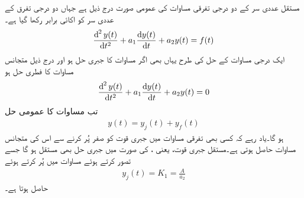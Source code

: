 مستقل عددی سر کے دو درجی تفرقی مساوات کی عمومی صورت درج ذیل ہے جہاں دو درجی تفرق کے عددی سر کو اکائی برابر رکھا گیا ہے۔
\begin{align}\label{مساوات_عارضی_دو_درجی_عمومی_الف}
\frac{\dif^{\,2} y(t)}{\dif t^2}+a_1\frac{\dif y(t)}{\dif t}+a_2 y(t)=f(t)
\end{align}
ایک درجی مساوات کے حل کی طرح یہاں بھی اگر مساوات  کا جبری حل  ہو اور درج ذیل متجانس مساوات کا فطری حل  ہو
 \begin{align}\label{مساوات_عارضی_دو_درجی_عمومی_ہم_جنسی_الف}
\frac{\dif^{\,2} y(t)}{\dif t^2}+a_1\frac{\dif y(t)}{\dif t}+a_2 y(t)=0
\end{align}
تب مساوات  کا عمومی حل
\begin{align}
y(t)=y_j(t)+y_f(t)
\end{align}
ہو گا۔یاد رہے کہ کسی بھی تفرقی مساوات میں جبری قوت کو صفر  پُر کرنے سے اس کی متجانس مساوات حاصل ہوتی ہے۔مستقل جبری قوت، یعنی ، کی صورت میں جبری حل بھی مستقل ہو گا جسے  تصور کرتے ہوئے مساوات  میں پُر کرتے ہوئے
\begin{align}
y_j(t)=K_1=\frac{A}{a_2}
\end{align}
حاصل ہوتا ہے۔


